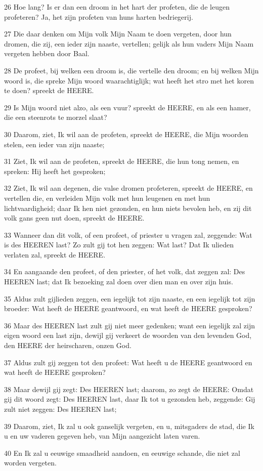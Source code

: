 \par 26 Hoe lang? Is er dan een droom in het hart der profeten, die de leugen profeteren? Ja, het zijn profeten van huns harten bedriegerij.
\par 27 Die daar denken om Mijn volk Mijn Naam te doen vergeten, door hun dromen, die zij, een ieder zijn naaste, vertellen; gelijk als hun vaders Mijn Naam vergeten hebben door Baal.
\par 28 De profeet, bij welken een droom is, die vertelle den droom; en bij welken Mijn woord is, die spreke Mijn woord waarachtiglijk; wat heeft het stro met het koren te doen? spreekt de HEERE.
\par 29 Is Mijn woord niet alzo, als een vuur? spreekt de HEERE, en als een hamer, die een steenrots te morzel slaat?
\par 30 Daarom, ziet, Ik wil aan de profeten, spreekt de HEERE, die Mijn woorden stelen, een ieder van zijn naaste;
\par 31 Ziet, Ik wil aan de profeten, spreekt de HEERE, die hun tong nemen, en spreken: Hij heeft het gesproken;
\par 32 Ziet, Ik wil aan degenen, die valse dromen profeteren, spreekt de HEERE, en vertellen die, en verleiden Mijn volk met hun leugenen en met hun lichtvaardigheid; daar Ik hen niet gezonden, en hun niets bevolen heb, en zij dit volk gans geen nut doen, spreekt de HEERE.
\par 33 Wanneer dan dit volk, of een profeet, of priester u vragen zal, zeggende: Wat is des HEEREN last? Zo zult gij tot hen zeggen: Wat last? Dat Ik ulieden verlaten zal, spreekt de HEERE.
\par 34 En aangaande den profeet, of den priester, of het volk, dat zeggen zal: Des HEEREN last; dat Ik bezoeking zal doen over dien man en over zijn huis.
\par 35 Aldus zult gijlieden zeggen, een iegelijk tot zijn naaste, en een iegelijk tot zijn broeder: Wat heeft de HEERE geantwoord, en wat heeft de HEERE gesproken?
\par 36 Maar des HEEREN last zult gij niet meer gedenken; want een iegelijk zal zijn eigen woord een last zijn, dewijl gij verkeert de woorden van den levenden God, den HEERE der heirscharen, onzen God.
\par 37 Aldus zult gij zeggen tot den profeet: Wat heeft u de HEERE geantwoord en wat heeft de HEERE gesproken?
\par 38 Maar dewijl gij zegt: Des HEEREN last; daarom, zo zegt de HEERE: Omdat gij dit woord zegt: Des HEEREN last, daar Ik tot u gezonden heb, zeggende: Gij zult niet zeggen: Des HEEREN last;
\par 39 Daarom, ziet, Ik zal u ook ganselijk vergeten, en u, mitsgaders de stad, die Ik u en uw vaderen gegeven heb, van Mijn aangezicht laten varen.
\par 40 En Ik zal u eeuwige smaadheid aandoen, en eeuwige schande, die niet zal worden vergeten.

